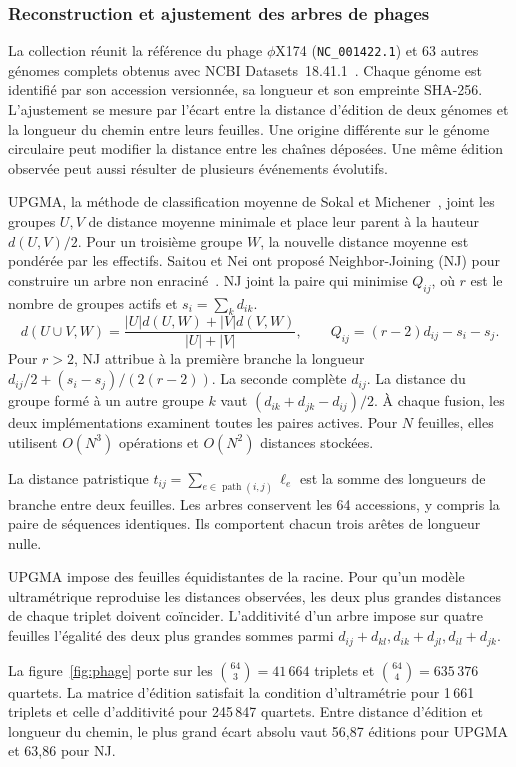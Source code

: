 \subsubsection{Reconstruction et ajustement des arbres de phages}
La collection réunit la référence du phage \(\phi\)X174 (\texttt{NC\_001422.1}) et 63 autres génomes complets obtenus avec NCBI Datasets~18.41.1~\cite{phixref,ncbidatasets}. Chaque génome est identifié par son accession versionnée, sa longueur et son empreinte SHA-256. L’ajustement se mesure par l’écart entre la distance d’édition de deux génomes et la longueur du chemin entre leurs feuilles. Une origine différente sur le génome circulaire peut modifier la distance entre les chaînes déposées. Une même édition observée peut aussi résulter de plusieurs événements évolutifs.

UPGMA, la méthode de classification moyenne de Sokal et Michener~\cite{upgma}, joint les groupes \(U,V\) de distance moyenne minimale et place leur parent à la hauteur \(d(U,V)/2\). Pour un troisième groupe \(W\), la nouvelle distance moyenne est pondérée par les effectifs. Saitou et Nei ont proposé Neighbor-Joining (NJ) pour construire un arbre non enraciné~\cite{nj}. NJ joint la paire qui minimise \(Q_{ij}\), où \(r\) est le nombre de groupes actifs et \(s_i=\sum_k d_{ik}\).
\[
 d(U\cup V,W)=\frac{|U|d(U,W)+|V|d(V,W)}{|U|+|V|},\qquad
 Q_{ij}=(r-2)d_{ij}-s_i-s_j.
\]
Pour \(r>2\), NJ attribue à la première branche la longueur \(d_{ij}/2+(s_i-s_j)/(2(r-2))\). La seconde complète \(d_{ij}\). La distance du groupe formé à un autre groupe \(k\) vaut \((d_{ik}+d_{jk}-d_{ij})/2\). À chaque fusion, les deux implémentations examinent toutes les paires actives. Pour \(N\) feuilles, elles utilisent \(O(N^3)\) opérations et \(O(N^2)\) distances stockées.

La distance patristique \(t_{ij}=\sum_{e\in\operatorname{path}(i,j)}\ell_e\) est la somme des longueurs de branche entre deux feuilles. Les arbres conservent les 64 accessions, y compris la paire de séquences identiques. Ils comportent chacun trois arêtes de longueur nulle.

UPGMA impose des feuilles équidistantes de la racine. Pour qu’un modèle ultramétrique reproduise les distances observées, les deux plus grandes distances de chaque triplet doivent coïncider. L'additivité d'un arbre impose sur quatre feuilles l'égalité des deux plus grandes sommes parmi \(d_{ij}+d_{kl},d_{ik}+d_{jl},d_{il}+d_{jk}\).

La figure~\ref{fig:phage} porte sur les \(\binom{64}{3}=41\,664\) triplets et \(\binom{64}{4}=635\,376\) quartets. La matrice d’édition satisfait la condition d’ultramétrie pour 1\,661 triplets et celle d’additivité pour 245\,847 quartets. Entre distance d’édition et longueur du chemin, le plus grand écart absolu vaut 56,87 éditions pour UPGMA et 63,86 pour NJ.

